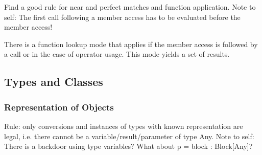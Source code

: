 Find a good rule for near and perfect matches and function application.
Note to self: The first call following a member access has to be evaluated before the member access!

There is a function lookup mode that applies if the member access is followed by a call or in the case of operator usage.
This mode yields a set of results. 


\subsection{Types and Classes}

\subsubsection{Representation of Objects}

Rule: only conversions and instances of types with known representation are legal, i.e. there cannot be a variable/result/parameter of type Any.
Note to self: There is a backdoor using type variables?
What about p = block : Block[Any]?